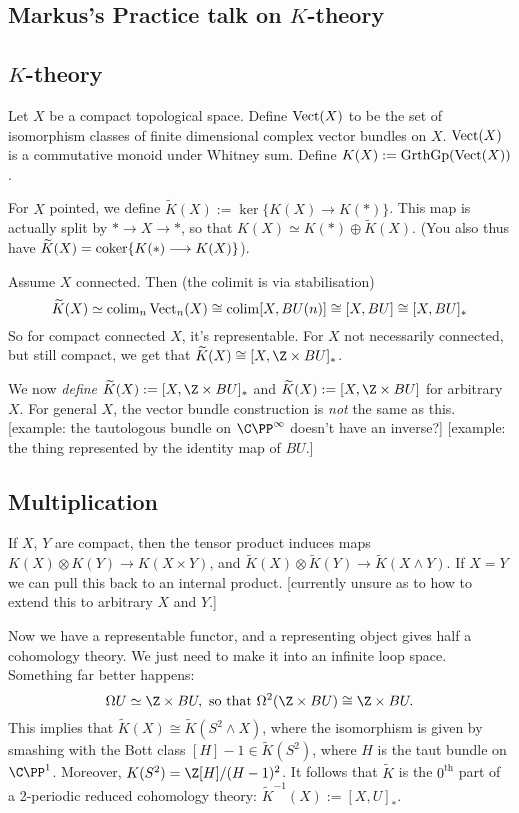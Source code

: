 \documentclass[11pt]{article}
\newcommand{\KanSemResponse}[1]
{
\thispagestyle{fancy}
\subsection*{#1}
}
\begin{document}
\begin{MarkusKtheoryPractice}
\KanSemResponse
{Markus's Practice talk on $K$-theory}
\subsection*{$K$-theory}
Let $X$ be a compact topological space. Define $\operatorname{Vect}(X)$ to be the set of isomorphism classes of finite dimensional complex vector bundles on $X$. $\operatorname{Vect}(X)$ is a commutative monoid under Whitney sum. Define $K(X):=\operatorname{GrthGp}(\operatorname{Vect}(X))$.

For $X$ pointed, we define $\widetilde K(X):=\ker\{K(X)\to K(\ast)\}$. This map is actually split by $\ast\to X\to \ast$, so that $K(X)\simeq K(\ast)\oplus\widetilde K(X)$. (You also thus have $\widetilde K(X)=\operatorname{coker}\{K(\ast)\longrightarrow K(X)\}$).

Assume $X$ connected. Then (the colimit is via stabilisation) 
\[\widetilde K(X)\simeq \operatorname{colim}_n\operatorname{Vect}_n(X)\cong \operatorname{colim}[X,BU(n)]\cong[X,BU]\cong[X,BU]_*\]
So for compact connected $X$, it's representable. For $X$ not necessarily connected, but still compact, we get that $\widetilde K(X)\cong[X,\Z\times BU]_*$.

We now \emph{define} $\widetilde K(X):=[X,\Z\times BU]_*$ and $\widetilde K(X):=[X,\Z\times BU]$ for arbitrary $X$. For general $X$, the vector bundle construction is \emph{not} the same as this. [example: the tautologous bundle on $\CP^\infty$ doesn't have an inverse?] [example: the thing represented by the identity map of $BU$.]
\subsection*{Multiplication}
If $X$, $Y$ are compact, then the tensor product induces maps $K(X)\otimes K(Y)\to K(X\times Y)$, and $\widetilde K(X)\otimes \widetilde K(Y)\to\widetilde K(X\wedge Y)$. If $X=Y$ we can pull this back to an internal product. [currently unsure as to how to extend this to arbitrary $X$ and $Y$.]

Now we have a representable functor, and a representing object gives half a cohomology theory. We just need to make it into an infinite loop space. Something far better happens:
\[\Omega U\simeq\Z\times BU,\text{ so that }\Omega^2(\Z\times BU)\cong \Z\times BU.\]
This implies that $\widetilde K(X)\cong \widetilde K(S^2\wedge X)$, where the isomorphism is given by smashing with the Bott class $[H]-1\in\widetilde K(S^2)$, where $H$ is the taut bundle on $\CP^1$. Moreover, $K(S^2)=\Z[H]/(H-1)^2$. It follows that $\widetilde K$ is the $0^\text{th}$ part of a 2-periodic reduced cohomology theory: $\widetilde K^{-1}(X):=[X,U]_*$.


\end{MarkusKtheoryPractice}
\end{document}

